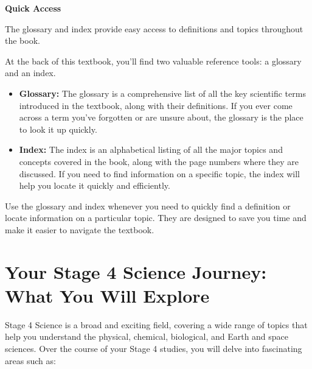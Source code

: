 \begin{marginnote}
\textbf{Quick Access}

The glossary and index provide easy access to definitions and topics throughout the book.
\end{marginnote}
At the back of this textbook, you’ll find two valuable reference tools: a glossary and an index.

\begin{itemize}
    \item \textbf{Glossary:}  The glossary is a comprehensive list of all the key scientific terms introduced in the textbook, along with their definitions.  If you ever come across a term you’ve forgotten or are unsure about, the glossary is the place to look it up quickly.
    \item \textbf{Index:} The index is an alphabetical listing of all the major topics and concepts covered in the book, along with the page numbers where they are discussed.  If you need to find information on a specific topic, the index will help you locate it quickly and efficiently.
\end{itemize}

Use the glossary and index whenever you need to quickly find a definition or locate information on a particular topic.  They are designed to save you time and make it easier to navigate the textbook.

\FloatBarrier

\section{Your Stage 4 Science Journey: What You Will Explore}

Stage 4 Science is a broad and exciting field, covering a wide range of topics that help you understand the physical, chemical, biological, and Earth and space sciences. Over the course of your Stage 4 studies, you will delve into fascinating areas such as:

